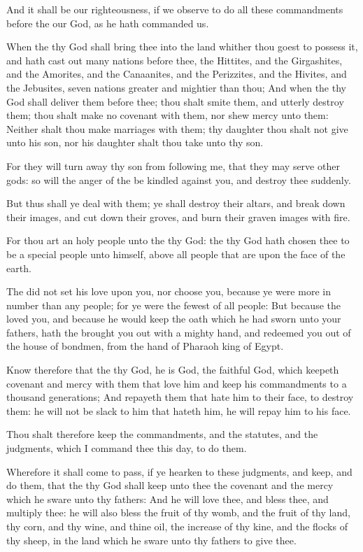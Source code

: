 \Verse And it shall be our righteousness, if we observe to do all these commandments before the \LORD our God, as he hath commanded us.


\Chapter
\Verse When the \LORD thy God shall bring thee into the land whither thou goest to possess it, and hath cast out many nations before thee, the Hittites, and the Girgashites, and the Amorites, and the Canaanites, and the Perizzites, and the Hivites, and the Jebusites, seven nations greater and mightier than thou; \Verse And when the \LORD thy God shall deliver them before thee; thou shalt smite them, and utterly destroy them; thou shalt make no covenant with them, nor shew mercy unto them: \Verse Neither shalt thou make marriages with them; thy daughter thou shalt not give unto his son, nor his daughter shalt thou take unto thy son.

\Verse For they will turn away thy son from following me, that they may serve other gods: so will the anger of the \LORD be kindled against you, and destroy thee suddenly.

\Verse But thus shall ye deal with them; ye shall destroy their altars, and break down their images, and cut down their groves, and burn their graven images with fire.

\Verse For thou art an holy people unto the \LORD thy God: the \LORD thy God hath chosen thee to be a special people unto himself, above all people that are upon the face of the earth.

\Verse The \LORD did not set his love upon you, nor choose you, because ye were more in number than any people; for ye were the fewest of all people: \Verse But because the \LORD loved you, and because he would keep the oath which he had sworn unto your fathers, hath the \LORD brought you out with a mighty hand, and redeemed you out of the house of bondmen, from the hand of Pharaoh king of Egypt.

\Verse Know therefore that the \LORD thy God, he is God, the faithful God, which keepeth covenant and mercy with them that love him and keep his commandments to a thousand generations; \Verse And repayeth them that hate him to their face, to destroy them: he will not be slack to him that hateth him, he will repay him to his face.

\Verse Thou shalt therefore keep the commandments, and the statutes, and the judgments, which I command thee this day, to do them.

\Verse Wherefore it shall come to pass, if ye hearken to these judgments, and keep, and do them, that the \LORD thy God shall keep unto thee the covenant and the mercy which he sware unto thy fathers: \Verse And he will love thee, and bless thee, and multiply thee: he will also bless the fruit of thy womb, and the fruit of thy land, thy corn, and thy wine, and thine oil, the increase of thy kine, and the flocks of thy sheep, in the land which he sware unto thy fathers to give thee.

